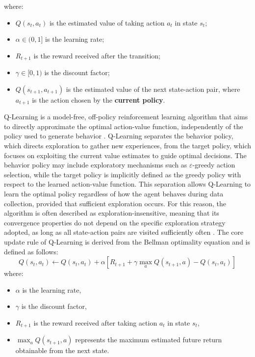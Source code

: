 \documentclass[12pt,a4paper]{report}
\begin{document}
\noindent where:
\begin{itemize}
    \item $Q(s_t, a_t)$ is the estimated value of taking action $a_t$ in 
    state $s_t$;
    \item $\alpha \in (0,1]$ is the learning rate;
    \item $R_{t+1}$ is the reward received after the transition;
    \item $\gamma \in [0,1)$ is the discount factor;
    \item $Q(s_{t+1}, a_{t+1})$ is the estimated value of the next 
    state-action pair, where $a_{t+1}$ is the action chosen by the 
    \textbf{current policy}.
\end{itemize}
Q-Learning is a model-free, off-policy reinforcement learning algorithm that aims to directly approximate the optimal action-value function, independently of the policy used to generate behavior \cite{chiave48}. Q-Learning separates the behavior policy, which directs exploration to gather new experiences, from the target policy, which focuses on exploiting the current value estimates to guide optimal decisions. The behavior policy may include exploratory mechanisms such as $\varepsilon$-greedy action selection, while the target policy is implicitly defined as the greedy policy with respect to the learned action-value function.
This separation allows Q-Learning to learn the optimal policy regardless of how the agent behaves during data collection, provided that sufficient exploration occurs. For this reason, the algorithm is often described as exploration-insensitive, meaning that its convergence properties do not depend on the specific exploration strategy adopted, as long as all state-action pairs are visited sufficiently often \cite{chiave45}.
The core update rule of Q-Learning is derived from the Bellman optimality equation and is defined as follows:
\[
Q(s_t, a_t) \leftarrow Q(s_t, a_t) + \alpha\left[R_{t+1} + \gamma \max_{a} Q(s_{t+1}, a) - Q(s_t, a_t)\right]
\]
where:
\begin{itemize}
    \item $\alpha$ is the learning rate,
    \item $\gamma$ is the discount factor,
    \item $R_{t+1}$ is the reward received after taking action $a_t$ in state $s_t$,
    \item $\max_{a} Q(s_{t+1}, a)$ represents the maximum estimated future return obtainable from the next state.
\end{itemize}
\end{document}

